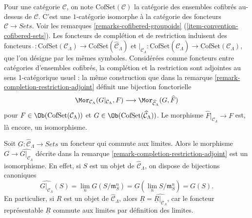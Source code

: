 \begin{remark}
\label{remark-completion-restriction-cofset-adjoint}
Pour une catégorie $\mathcal{C}$, on note $\text{CofSet}(\mathcal{C})$ la
catégorie des ensembles cofibrés au-dessus de $\mathcal{C}$. C'est une
$1$-catégorie isomorphe à la catégorie des foncteurs
$\mathcal{C} \to \textit{Sets}$. Voir les remarques
\ref{remarks-cofibered-groupoids}
(\ref{item-convention-cofibered-sets}).
Les foncteurs de complétion et de restriction induisent des foncteurs
$\widehat{~} : \text{CofSet}(\mathcal{C}_\Lambda) \to
\text{CofSet}(\widehat{\mathcal{C}}_\Lambda)$ et
$|_{\mathcal{C}_\Lambda} : \text{CofSet}(\widehat{\mathcal{C}}_\Lambda) \to
\text{CofSet}(\mathcal{C}_\Lambda)$, que l'on désigne par les mêmes symboles.
Considérées comme foncteurs entre catégories d'ensembles cofibrés, la
complétion et la restriction sont adjointes au sens 1-catégorique usuel :
la même construction que dans la remarque
\ref{remark-completion-restriction-adjoint} définit une bijection fonctorielle
$$
\Mor_{\mathcal{C}_\Lambda}(G|_{\mathcal{C}_\Lambda}, F)
\longrightarrow
\Mor_{\widehat{\mathcal{C}}_\Lambda}(G, \widehat{F})
$$
pour $F \in \Ob(\text{CofSet}(\mathcal{C}_\Lambda))$ et
$G \in \Ob(\text{CofSet}(\widehat{\mathcal{C}}_\Lambda))$.
Le morphisme $\widehat{F}|_{\mathcal{C}_\Lambda} \to F$ est, là encore, un
isomorphisme.
\end{remark}

\begin{remark}
\label{remark-restrict-complete-continuous-functor}
Soit $G : \widehat{\mathcal{C}}_\Lambda \to \textit{Sets}$ un foncteur qui
commute aux limites. Alors le morphisme
$G \to \widehat{G|_{\mathcal{C}_\Lambda}}$ décrite dans la remarque
\ref{remark-completion-restriction-adjoint} est un isomorphisme. En effet, si
$S$ est un objet de $\widehat{\mathcal{C}}_\Lambda$, on dispose de bijections
canoniques
$$
\widehat{G|_{\mathcal{C}_\Lambda}}(S) =
\lim_n G(S/\mathfrak{m}_S^n) =
G(\lim_n S/\mathfrak{m}_S^n) = G(S).
$$
En particulier, si $R$ est un objet de $\widehat{\mathcal{C}}_\Lambda$, alors
$\underline{R} = \widehat{\underline{R}|_{\mathcal{C}_\Lambda}}$, car le
foncteur représentable $\underline{R}$ commute aux limites par définition des
limites.
\end{remark}

